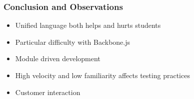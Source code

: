 \documentclass{beamer}
\begin{document}
\begin{frame}[fragile]
\frametitle{Conclusion and Observations}
	\begin{itemize}
  	 \item Unified language both helps and hurts students
	 \item Particular difficulty with Backbone.js
  	 \item Module driven development
	 \item High velocity and low familiarity affects testing practices
  	 \item Customer interaction
	\end{itemize}
\end{frame}
\end{document}
